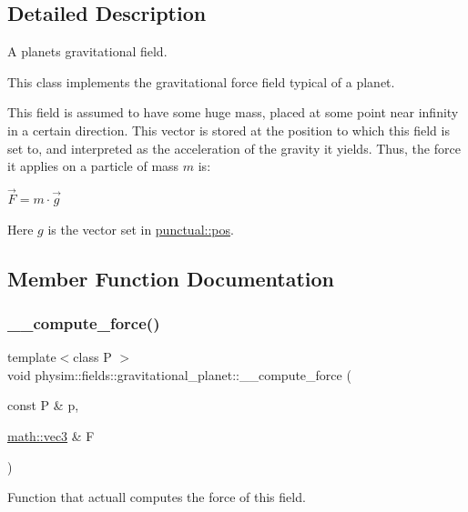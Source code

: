 \subsection{Detailed Description}
A planet\textquotesingle{}s gravitational field. 

This class implements the gravitational force field typical of a planet.

This field is assumed to have some huge mass, placed at some point near infinity in a certain direction. This vector is stored at the position to which this field is set to, and interpreted as the acceleration of the gravity it yields. Thus, the force it applies on a particle of mass $m$ is\+:

$\vec{F} = m\cdot \vec{g}$

Here $g$ is the vector set in \hyperlink{classphysim_1_1fields_1_1punctual_a00344d6f3e4f3f841e7d876918c66977}{punctual\+::pos}. 

\subsection{Member Function Documentation}
\mbox{\label{classphysim_1_1fields_1_1gravitational__planet_a5bb7992e6b6b03144262e0dfb3639f17}} 
\subsubsection{\texorpdfstring{\+\_\+\+\_\+compute\+\_\+force()}{\_\_compute\_force()}}
{\footnotesize\ttfamily template$<$class P $>$ \\
void physim\+::fields\+::gravitational\+\_\+planet\+::\+\_\+\+\_\+compute\+\_\+force (\begin{DoxyParamCaption}\item[{const P \&}]{p,  }\item[{\hyperlink{structphysim_1_1math_1_1vec3}{math\+::vec3} \&}]{F }\end{DoxyParamCaption})\hspace{0.3cm}{\ttfamily [private]}}



Function that actuall computes the force of this field. 

